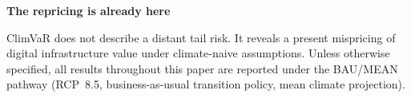 \thispagestyle{chapterstart}

\vspace{2mm}



{\color{SEGreen}\textbf{\Large The repricing is already here}}
\vspace{1mm}

\noindent ClimVaR does not describe a distant tail risk. It reveals a present mispricing of digital infrastructure value under climate-naive assumptions. Unless otherwise specified, all results throughout this paper are reported under the BAU/MEAN pathway (RCP~8.5, business-as-usual transition policy, mean climate projection).

\vspace{2mm}


